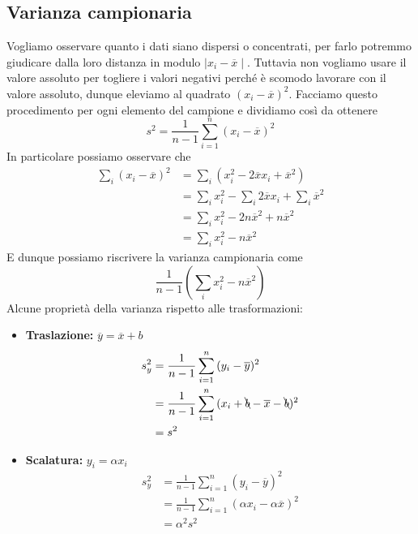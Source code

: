 \documentclass[11pt]{report}
\begin{document}
\subsection{Varianza campionaria}
Vogliamo osservare quanto i dati siano dispersi o concentrati, per farlo potremmo giudicare dalla loro distanza in modulo $\mid x_i - \overline{x} \mid$. Tuttavia non vogliamo usare il valore assoluto per togliere i valori negativi perché è scomodo lavorare con il valore assoluto, dunque eleviamo al quadrato $(x_i - \overline{x})^2$. Facciamo questo procedimento per ogni elemento del campione e dividiamo così da ottenere
\begin{equation}
    s^2 = \frac{1}{n-1}\sum_{i=1}^{n}(x_i - \overline{x})^2
\end{equation}
In particolare possiamo osservare che
\begin{equation}
    \begin{split}
        \sum_i(x_i - \overline{x})^2 & = \sum_i(x_i^2 - 2\overline{x}x_i + \overline{x}^2)\\
        & = \sum_ix_i^2 - \sum_i2\overline{x}x_i + \sum_i\overline{x}^2\\
        & = \sum_ix_i^2 - 2n\overline{x}^2 + n\overline{x}^2\\
        & = \sum_ix_i^2 - n\overline{x}^2
    \end{split}
\end{equation}
E dunque possiamo riscrivere la varianza campionaria come
\begin{equation}
    \frac{1}{n-1}\left(\sum_ix_i^2 - n\overline{x}^2\right)
\end{equation}
Alcune proprietà della varianza rispetto alle trasformazioni:
	\begin{itemize}
		\item \textbf{Traslazione:} $\overline{y} =\overline{x}+b$
            \begin{equation}
                \begin{split}
                    s_y^2 & =\frac{1}{n-1}\sum_{i=1}^n{(y_i-\overline{y})^2}\\
                    & = \frac{1}{n-1}\sum_{i=1}^n{(x_i+\bcancel{b}-\overline{x}-\bcancel{b})^2}\\
                    & =s^2
                \end{split}
            \end{equation}
    	\item \textbf{Scalatura:} $y_i = \alpha x_i$
            \begin{equation}
                \begin{split}
                    s_y^2 & =\frac{1}{n-1}\sum_{i=1}^n{(y_i-\overline{y})^2}\\
                    & = \frac{1}{n-1}\sum_{i=1}^n{(\alpha x_i-\alpha \overline{x})^2}\\
                    & = \alpha^2s^2
                \end{split}
            \end{equation}
  	\end{itemize}
\end{document}

